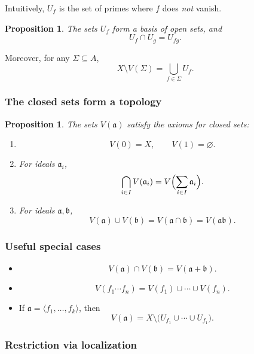 \documentclass[11pt,a4paper]{article}
\theoremstyle{definition}
\theoremstyle{plain}
\newtheorem{proposition}[definition]{Proposition}
\theoremstyle{remark}
\begin{document}
Intuitively, $U_{f}$ is the set of primes where $f$ does \emph{not} vanish.

\begin{proposition}
The sets $U_{f}$ form a basis of open sets, and
\[
U_{f}\cap U_{g}=U_{fg}.
\]
\end{proposition}

Moreover, for any $\Sigma\subseteq A$,
\[
X\setminus V(\Sigma)=\bigcup_{f\in\Sigma}U_{f}.
\]

\subsubsection*{The closed sets form a topology}

\begin{proposition}
The sets $V(\mathfrak a)$ satisfy the axioms for closed sets:
\begin{enumerate}
\item
\[
V(0)=X,\qquad V(1)=\varnothing.
\]

\item For ideals $\mathfrak a_i$,
\[
\bigcap_{i\in I}V(\mathfrak a_i)=V\Bigl(\sum_{i\in I}\mathfrak a_i\Bigr).
\]

\item For ideals $\mathfrak a,\mathfrak b$,
\[
V(\mathfrak a)\cup V(\mathfrak b)=V(\mathfrak a\cap\mathfrak b)=V(\mathfrak a\mathfrak b).
\]
\end{enumerate}
\end{proposition}

\subsubsection*{Useful special cases}

\begin{itemize}
\item
\[
V(\mathfrak a)\cap V(\mathfrak b)=V(\mathfrak a+\mathfrak b).
\]

\item
\[
V(f_1\cdots f_n)=V(f_1)\cup\cdots\cup V(f_n).
\]

\item If $\mathfrak a=\langle f_1,\dots,f_k\rangle$, then
\[
V(\mathfrak a)=X\setminus\bigl(U_{f_1}\cup\cdots\cup U_{f_1 }\bigr).
\]
\end{itemize}

\subsubsection*{Restriction via localization}
\end{document}
